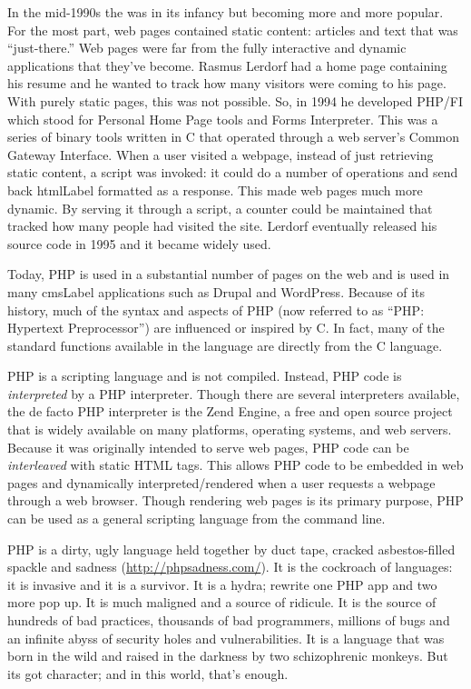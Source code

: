 

In the mid-1990s the 
was in its infancy but
becoming more and more popular.  For the most part, web pages
contained static content: articles and text that was ``just-there.''
Web pages were far from the fully interactive and dynamic 
applications that they've become.  Rasmus Lerdorf had a home
page containing his resume and he wanted to track how many
visitors were coming to his page.  With purely static pages, this
was not possible.  So, in 1994 he developed PHP/FI which stood
for Personal Home Page tools and Forms Interpreter.  This was 
a series of binary tools written in C that operated through a 
web server's Common Gateway Interface.  When a user visited
a webpage, instead of just retrieving static content, a script
was invoked: it could do a number of operations and 
send back \gls{htmlLabel} formatted as a response.  This made
web pages much more dynamic.  By serving it through a script,
a counter could be maintained that tracked how many people
had visited the site.  Lerdorf eventually released his source
code in 1995 and it became widely used.

Today, PHP is used in a substantial number of pages on the web and
is used in many \gls{cmsLabel} applications such as Drupal and 
WordPress.  Because of its history, much of the syntax and aspects of 
PHP (now referred to as ``PHP: Hypertext Preprocessor'') are 
influenced or inspired by C.  In fact, many of the standard
functions available in the language are directly from the C
language.

PHP is a scripting language and is not compiled.  Instead, PHP
code is \emph{interpreted} by a PHP interpreter.  Though there
are several interpreters available, the de facto PHP 
interpreter is the Zend Engine, a free and open source
project that is widely available on many platforms, operating
systems, and web servers.  Because it was originally intended 
to serve web pages, PHP 
code can be \emph{interleaved} with static HTML tags.  This
allows PHP code to be embedded in web pages and dynamically
interpreted/rendered when a user requests a webpage through
a web browser.  Though rendering web pages is its primary 
purpose, PHP can be used as a general scripting language 
from the command line.

PHP is a dirty, ugly language held together by duct tape, cracked
asbestos-filled spackle and sadness (\url{http://phpsadness.com/}).  
It is the cockroach of languages: it 
is invasive and it is a survivor.  It is a hydra; rewrite one PHP app
and two more pop up.  It is much maligned and a source of ridicule.
It is the source of hundreds of bad practices, thousands of bad 
programmers, millions of bugs and an infinite abyss of security 
holes and vulnerabilities.  It is a language that was born in the
wild and raised in the darkness by two schizophrenic monkeys.
But its got character; and in this world, that's enough.

